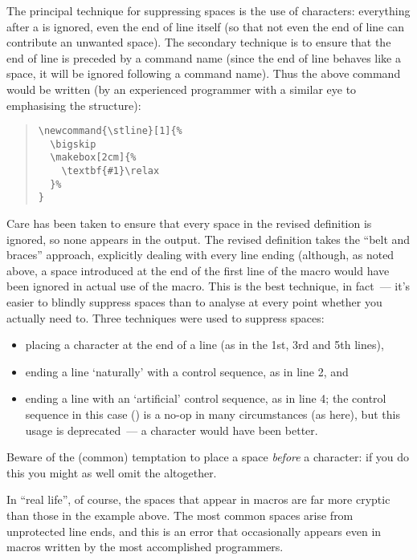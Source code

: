 The principal technique for suppressing spaces is the use of
\texttt{\textpercent{}} characters: everything after a
\texttt{\textpercent{}} is ignored, even the end of line itself (so
that not even the end of line can contribute an unwanted space).  The
secondary technique is to ensure that the end of line is preceded by a
command name (since the end of line behaves like a space, it will be
ignored following a command name).  Thus the above command would be
written (by an experienced programmer with a similar eye to
emphasising the structure):
\begin{quote}
\begin{verbatim}
\newcommand{\stline}[1]{%
  \bigskip
  \makebox[2cm]{%
    \textbf{#1}\relax
  }%
}
\end{verbatim}
\end{quote}
Care has been taken to ensure that every space in the revised
definition is ignored, so none appears in the output.  The revised
definition takes the ``belt and braces'' approach, explicitly dealing
with every line ending (although, as noted above, a space introduced
at the end of the first line of the macro would have been ignored in
actual use of the macro.  This is the best technique, in fact~--- it's
easier to blindly suppress spaces than to analyse at every point
whether you actually need to.  Three techniques were used to suppress
spaces:
\begin{itemize}
\item placing a \texttt{\textpercent{}} character at the end of a line
  (as in the 1st, 3rd and 5th lines),
\item ending a line `naturally' with a control sequence, as in line 2,
  and
\item ending a line with an `artificial' control sequence, as in line
  4; the control sequence in this case () is a no-op in many
  circumstances (as here), but this usage is deprecated~--- a
  \texttt{\textpercent{}} character would have been better.
\end{itemize}
Beware of the (common) temptation to place a space \emph{before} a
\texttt{\textpercent{}} character: if you do this you might as well omit
the \texttt{\textpercent{}} altogether.

In ``real life'', of course, the spaces that appear in macros are far
more cryptic than those in the example above.  The most common spaces
arise from unprotected line ends, and this is an error that
occasionally appears even in macros written by the most accomplished
programmers.

